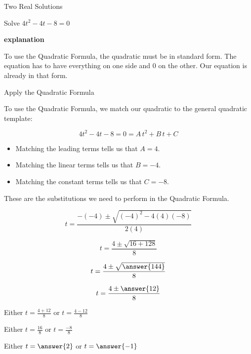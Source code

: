 \documentclass{ximera}
\begin{document}
\begin{example} Two Real Solutions 

Solve $4 t^2 - 4 t - 8 = 0$ 


\textbf{\textcolor{red!75!green}{explanation}} 


To use the Quadratic Formula, the quadratic must be in standard form. The equation has to have everything on one side and $0$ on the other.  Our equation is already in that form.

Apply the Quadratic Formula




To use the Quadratic Formula, we match our quadratic to the general quadratic template:

\[
4 t^2 - 4 t - 8 = 0 = A \, t^2 + B \, t + C
\]


\begin{itemize}
\item Matching the leading terms tells us that $A = 4$.
\item Matching the linear terms tells us that $B = -4$.
\item Matching the constant terms tells us that $C = -8$.
\end{itemize}

These are the substitutions we need to perform in the Quadratic Formula.


















\[   t = \frac{-(-4) \pm \sqrt{(-4)^2 - 4 (4) (-8)}}{2 (4)}            \]

\[   t = \frac{4 \pm \sqrt{16 + 128}}{8}            \]

\[   t = \frac{4 \pm \sqrt{\answer{144}}}{8}            \]

\[   t = \frac{4 \pm \answer{12}}{8}            \]




Either $t = \frac{4 + 12}{8} $ or $t = \frac{4 - 12}{8} $

Either $t = \frac{16}{8} $ or $t = \frac{-8}{8} $

Either $t = \answer{2}$ or $t = \answer{-1}$



\end{example}
\end{document}
